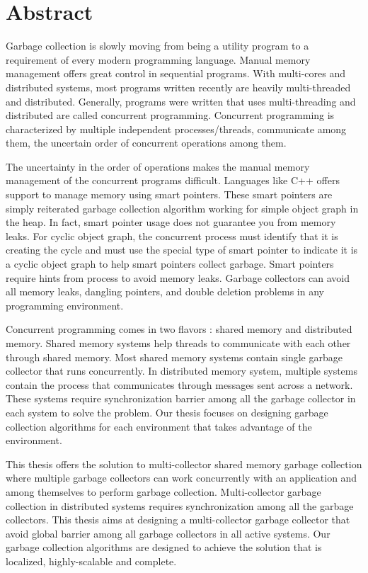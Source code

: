 \chapter*{Abstract}
\label{ch:abstract}
Garbage collection is slowly moving from being a utility program to a requirement of every modern programming language. Manual memory management offers great control in sequential programs. With multi-cores and distributed systems, most programs written recently are heavily multi-threaded and distributed. Generally, programs were written that uses multi-threading and distributed are called concurrent programming. Concurrent programming is characterized by multiple independent processes/threads, communicate among them, the uncertain order of concurrent operations among them.

The uncertainty in the order of operations makes the manual memory management of the concurrent programs difficult. Languages like C++ offers support to manage memory using smart pointers. These smart pointers are simply reiterated garbage collection algorithm working for simple object graph in the heap. In fact, smart pointer usage does not guarantee you from memory leaks. For cyclic object graph, the concurrent process must identify that it is creating the cycle and must use the special type of smart pointer to indicate it is a cyclic object graph to help smart pointers collect garbage. Smart pointers require hints from process to avoid memory leaks. Garbage collectors can avoid all memory leaks, dangling pointers, and double deletion problems in any programming environment. 

Concurrent programming comes in two flavors : shared memory and distributed memory. Shared memory systems help threads to communicate with each other through shared memory. Most shared memory systems contain single garbage collector that runs concurrently. In distributed memory system, multiple systems contain the process that communicates through messages sent across a network. These systems require synchronization barrier among all the garbage collector in each system to solve the problem. Our thesis focuses on designing garbage collection algorithms for each environment that takes advantage of the environment. 

This thesis offers the solution to multi-collector shared memory garbage collection where multiple garbage collectors can work concurrently with an application and among themselves to perform garbage collection. Multi-collector garbage collection in distributed systems requires synchronization among all the garbage collectors. This thesis aims at designing a multi-collector garbage collector that avoid global barrier among all garbage collectors in all active systems. Our garbage collection algorithms are designed to achieve the solution that is localized, highly-scalable and complete.

